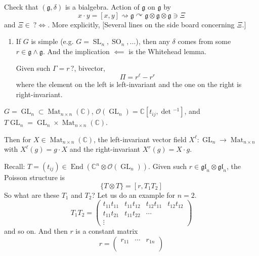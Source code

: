 \begin{exercise}
\label{exercise-l2-bialgebra}
Check that $(\mathfrak{g},\delta)$ is a
bialgebra. Action of $\mathfrak{g}$ on
$\mathfrak{g}$ by
$$
x\cdot y=[x,y]\rightsquigarrow
\mathfrak{g}\curvearrowright
\mathfrak{g}\otimes \mathfrak{g}\otimes
\mathfrak{g}\ni\Xi
$$
and $\Xi\in\ ?\iff$. More explicitly,
[Several lines on the side board
concerning $\Xi$.]
\end{exercise}

\begin{remark}
\label{remark-l2-simple}
\begin{enumerate}
\item If $G$ is simple (e.g.
$G=\operatorname{SL}_{n},
\operatorname{SO}_{n},\ldots$), then any
$\delta$ comes from some
$r\in \mathfrak{g}\wedge \mathfrak{g}$.
And the implication $\impliedby$ is the
Whitehead lemma.

Given such $\Gamma=r\,?$, bivector,
$$
\Pi=r^{\ell}-r^{r}
$$
where the element on the left is
left-invariant and the one on the right
is right-invariant.
\end{enumerate}
\end{remark}

\begin{example}
\label{example-l2-gln}
$G=\operatorname{GL}_{n}\subset
\operatorname{Mat}_{n\times n}
(\mathbb{C})$,
$\mathcal{O}(\operatorname{GL}_{n})=
\mathbb{C}[t_{ij},\det{}^{-1}]$, and
$T\operatorname{GL}_{n}=
\operatorname{GL}_{n}\times
\operatorname{Mat}_{n\times n}
(\mathbb{C})$.

Then for $X\in \operatorname{Mat}_{n\times
n}(\mathbb{C})$, the left-invariant vector
field
$X^{\ell}:\operatorname{GL}_{n}\to
\operatorname{Mat}_{n\times n}$ with
$X^{\ell} (g)=g\cdot X$ and the
right-invariant $X^{r} (g)=X\cdot g$.

Recall:
$T=(t_{ij})\in \operatorname{End}
(\mathbb{C}^{n} \otimes
\mathcal{O}(\operatorname{GL}_{n}))$.
Given such
$r\in \mathfrak{gl}_{n}\otimes
\mathfrak{gl}_{n}$, the Poisson structure
is
$$
\{T\otimes T\}=[r,T_{1}T_{2}]
$$
So what are these $T_{1}$ and $T_{2}$?
Let us do an example for $n=2$.
$$
T_{1}T_{2}=\begin{pmatrix}
t_{11}t_{11}&t_{11}t_{12}&
t_{12}t_{11}&t_{12}t_{12}\\
t_{11}t_{21}&t_{11}t_{22}&\cdots \\
\vdots
\end{pmatrix}
$$
and so on. And then $r$ is a constant
matrix
$$
r=\begin{pmatrix}
r_{11} &\cdots &r_{1n}\\&&\\&
\end{pmatrix}
$$
\end{example}

